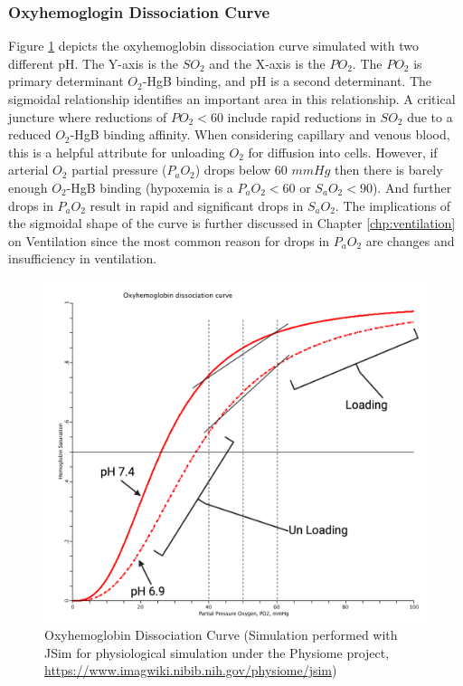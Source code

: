 \subsubsection{Oxyhemoglogin Dissociation Curve}

Figure \ref{fig:oxyhemo1} depicts the oxyhemoglobin dissociation curve simulated with two different pH. The Y-axis is the $SO_2$ and the X-axis is the $PO_2$. The $PO_2$ is primary determinant $O_2$-HgB binding, and pH is a second determinant. The sigmoidal relationship identifies an important area in this relationship. A critical juncture where reductions of $PO_2 < 60$ include rapid reductions in $SO_2$ due to a reduced $O_2$-HgB binding affinity. When considering capillary and venous blood, this is a helpful attribute for unloading $O_2$ for diffusion into cells. However, if arterial $O_2$ partial pressure ($P_aO_2$) drops below 60 $mmHg$ then there is barely enough $O_2$-HgB binding (hypoxemia is a $P_aO_2 <60$ or $S_aO_2 < 90$). And further drops in $P_aO_2$ result in rapid and significant drops in $S_aO_2$. The implications of the sigmoidal shape of the curve is further discussed in Chapter \ref{chp:ventilation} on Ventilation since the most common reason for drops in $P_aO_2$ are changes and insufficiency in ventilation. 

\begin{figure}[!h]
    \centering
    \includegraphics[width=1.0\linewidth]{./figure/oxyhemo1.png}
    \caption{Oxyhemoglobin Dissociation Curve \footnotesize{(Simulation performed with JSim for physiological simulation under the Physiome project, \url{https://www.imagwiki.nibib.nih.gov/physiome/jsim}})}
    \label{fig:oxyhemo1}
\end{figure}


